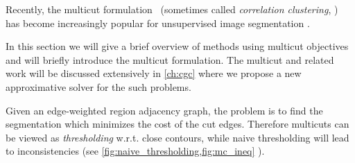 Recently, the multicut formulation~\cite{chopra_1993_mp} 
(sometimes called \emph{correlation clustering}, \cite{bansal_2004_ml}) 
has become increasingly popular for unsupervised
image segmentation \cite{andres_2011_iccv,yarkony_2012_eccv,alush_2013_simbad}.

In this section we will give a brief overview of methods using multicut objectives
and will briefly introduce the multicut formulation.
The multicut and related work will be discussed extensively in \cref{ch:cgc} where
we propose a new approximative solver for the such problems.


Given an edge-weighted region adjacency graph,
the problem is to find the segmentation which
minimizes the cost of the cut edges.
Therefore multicuts can be viewed as \emph{thresholding} w.r.t. close contours, while
naive thresholding will lead to inconsistencies 
(see \cref{fig:naive_thresholding,fig:mc_ineq} ).


